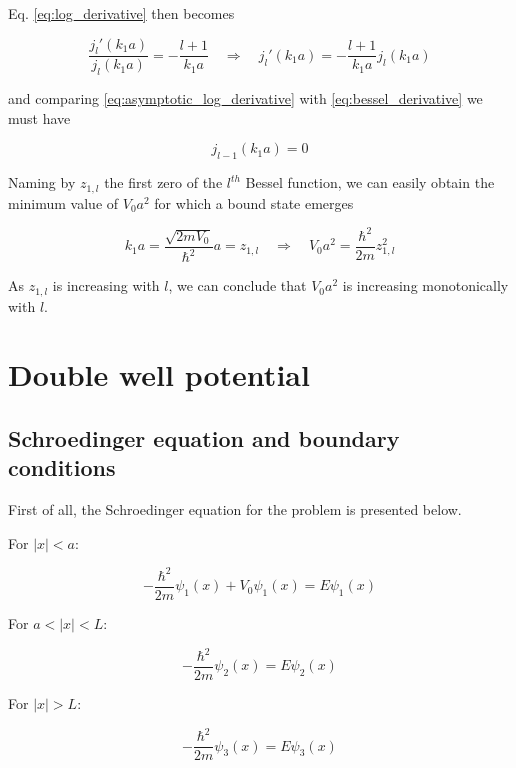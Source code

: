 \documentclass{article}
\begin{document}
Eq. \eqref{eq:log_derivative} then becomes

\begin{equation}
\label{eq:asymptotic_log_derivative}
\frac{j_l'(k_1a)}{j_l(k_1a)} = - \frac{l+1}{k_1a} \quad \Rightarrow \quad j_l'(k_1a) = - \frac{l+1}{k_1a} j_l(k_1a)
\end{equation}

and comparing \eqref{eq:asymptotic_log_derivative} with \eqref{eq:bessel_derivative} we must have

\begin{equation}
j_{l-1}(k_1a) = 0
\end{equation}

Naming by \( z_{1,l} \) the first zero of the \( l^{th} \) Bessel function, we can easily obtain the minimum value of \(V_0a^2 \) for which a bound state emerges

\begin{equation}
k_1a = \frac{\sqrt{2mV_0}}{\hbar^2}a = z_{1,l} \quad \Rightarrow \quad V_0a^2 = \frac{\hbar^2}{2m}z_{1,l}^2
\end{equation}

As \(z_{1,l} \) is increasing with \(l\), we can conclude that \(V_0a^2\) is increasing monotonically with \(l\).

\section{Double well potential}

\subsection{Schroedinger equation and boundary conditions}
First of all, the Schroedinger equation for the problem is presented below.

For \(\left|x\right| < a\):

\begin{equation}
\label{eq:schr1}
-\frac{\hbar^2}{2m}\psi_{1}(x) + V_{0}\psi_{1}(x) = E\psi_{1}(x)
\end{equation}

For \(a < \left|x\right| < L\):

\begin{equation}
\label{eq:schr2}
-\frac{\hbar^2}{2m}\psi_{2}(x) = E\psi_{2}(x)
\end{equation}

For \(\left|x\right| > L\):

\begin{equation}
\label{eq:schr3}
-\frac{\hbar^2}{2m}\psi_{3}(x) = E\psi_{3}(x)
\end{equation}
\end{document}
